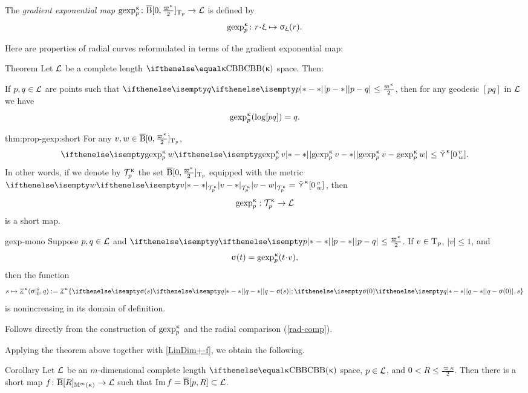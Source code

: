The \emph{gradient exponential map} 
$\gexp\mc\kappa_p\:\cBall[\0,\tfrac{\varpi\kappa}2]_{\T_p}\to \spc{L}$
is defined by
\[
\gexp\mc\kappa_p\: r\cdot\xi\mapsto\sigma_\xi(r).
\]



Here are properties of radial curves reformulated in terms of the gradient exponential map:

\begin{thm}{Theorem}\label{thm:prop-gexp}
Let $\mathcal{L}$ be a complete length $\Alex{\kappa}$ space. 
Then:
\begin{subthm}{}
If $p,q\in \spc{L}$ are points such that $\dist{p}{q}{}\le\tfrac{\varpi\kappa}2$, then for any geodesic $[pq]$ in $\mathcal{L}$ we have
\[\mathop{\rm gexp}\nolimits^{\upkappa}_p(\mathrm{log}[{p}{q}])=q.\] 
\end{subthm}

\begin{subthm}{thm:prop-gexp:short} 
For any $v,w\in \cBall[\0,\tfrac{\varpi\kappa}2]_{\T_p}$,
\[\dist{\gexp\mc\kappa_p v}{\gexp\mc\kappa_p w}{}
\le
\side\kappa\hinge{\0}v w.\]
In other words, if we denote by $\mathcal{T}_{p}^{\upkappa}$ the set $\cBall[\0,\tfrac{\varpi\kappa}2]_{\T_p}$ 
equipped with the metric $\dist{v}{w}{\mathcal{T}\mc\kappa_{p}}=\side\kappa\hinge{\0}v w$, 
then 
\[\gexp\mc\kappa_p:\mathcal{T}\mc\kappa_{p}\to \spc{L}\] 
is a short map.
\end{subthm}

\begin{subthm}{gexp-mono} 
Suppose
$p, q\in \spc{L}$ 
and $\dist{p}{q}{}\le \tfrac{\varpi\kappa}2$.
If $v\in\T_p$, $|v|\le 1$, and 
\[\sigma(t)=\gexp\mc\kappa_p(t\cdot v),\]
then the function
\[
s
\mapsto 
\tangle\mc\kappa(\sigma|_0^s,q)
\df
\tangle\mc\kappa\{\dist{q}{\sigma(s)}{};\dist{q}{\sigma(0)}{},s\}
\]
is nonincreasing in its domain of definition.
\end{subthm}
\end{thm}

Follows directly from the construction of $\mathop{\rm gexp}\nolimits^{\upkappa}_p$ and the radial comparison (\ref{rad-comp}).
\qeds

Applying the theorem above together with \ref{LinDim+-f},
we obtain the following.

{\sloppy 
 
\begin{thm}{Corollary}\label{cor:short-map-to-ball}
Let $\mathcal{L}$ be an $m$-dimensional complete length $\Alex\kappa$ space, $p\in\spc{L}$, and $0<R\le\tfrac{\varpi\kappa}2$.
Then there is a short map 
$f\:\cBall[R]_{\Lob{m}{\kappa}}\to \spc{L}$
such that $\Im f= \cBall[p,R]\subset \spc{L}$.
\end{thm}

}





